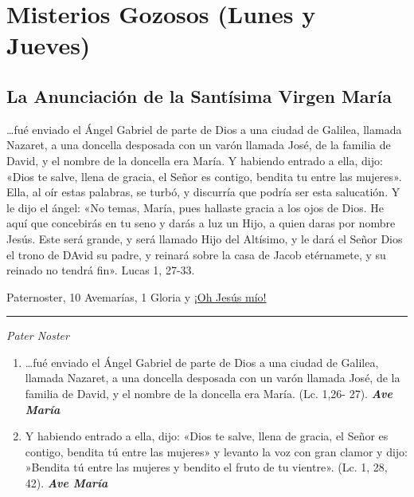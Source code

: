 \documentclass[a4paper,11pt, oneside]{report}
\begin{document}
\section*{Misterios Gozosos (Lunes y Jueves)}\label{sec:gozosos}
{  
  \subsection*{La Anunciación de la Santísima Virgen María}
  {
    {\ldots}fué enviado el Ángel Gabriel de parte de Dios a una ciudad de Galilea, llamada Nazaret, a una doncella desposada con un varón llamada José, 
    de la familia de David, y el nombre de la doncella era María. Y habiendo entrado a ella, dijo: «Dios te salve, llena de gracia, el Señor es contigo, 
    bendita tu entre las mujeres». Ella, al oír estas palabras, se turbó, y discurría que podría ser esta salucatión. 
    Y le dijo el ángel: «No temas, María, pues hallaste gracia a los ojos de Dios. He aquí que concebirás en tu seno y darás a luz un Hijo, a quien 
    daras por nombre Jesús. Este será grande, y será llamado Hijo del Altísimo, y le dará el Señor Dios el trono de DAvid su padre, y reinará sobre 
    la casa de Jacob etérnamete, y su reinado no tendrá fin». Lucas 1, 27-33.
    
     Paternoster, 10 Avemarías, 1 Gloria y \hyperlink{finalAnunciacion}{¡Oh Jesús mío!}
    
    \medskip

    \begin{center}\rule{1\linewidth}{\linethickness}\end{center}

    \medskip

    \textit{Pater Noster}
      
    \begin{enumerate}
      \item {\ldots}fué enviado el Ángel Gabriel de parte de Dios a una ciudad de Galilea, llamada Nazaret, a una 
      doncella desposada con un varón llamada José, de la familia de David, y el nombre de la doncella era María. (Lc. 1,26- 27). \textbf{\textit{Ave María}}

      \item Y habiendo entrado a ella, dijo: «Dios te salve, llena de gracia, el Señor es contigo, bendita tú entre las mujeres»
      y levanto la voz con gran clamor y dijo: »Bendita tú entre las mujeres y bendito el fruto de tu vientre». (Lc. 1, 28, 42). \textbf{\textit{Ave María}}


\end{enumerate}}}
\end{document}
